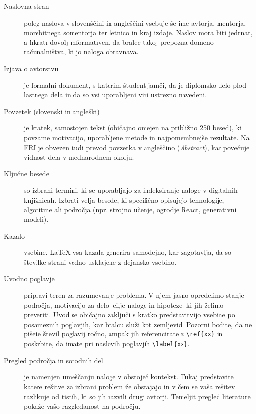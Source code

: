 \documentclass[a4paper,12pt,openright]{book}
\begin{document}
\begin{description}
    \item[Naslovna stran] poleg naslova v slovenščini in angleščini vsebuje še ime avtorja, mentorja, morebitnega somentorja ter letnico in kraj izdaje. Naslov mora biti jedrnat, a hkrati dovolj informativen, da bralec takoj prepozna domeno računalništva, ki jo naloga obravnava.
    
    \item[Izjava o avtorstvu] je formalni dokument, s katerim študent jamči, da je diplomsko delo plod lastnega dela in da so vsi uporabljeni viri ustrezno navedeni.
    
    \item[Povzetek (slovenski in angleški)] je kratek, samostojen tekst (običajno omejen na približno 250 besed), ki povzame motivacijo, uporabljene metode in najpomembnejše rezultate. Na FRI je obvezen tudi prevod povzetka v angleščino (\textit{Abstract}), kar povečuje vidnost dela v mednarodnem okolju.
    
    \item[Ključne besede] so izbrani termini, ki se uporabljajo za indeksiranje naloge v digitalnih knjižnicah. Izbrati velja besede, ki specifično opisujejo tehnologije, algoritme ali področja (npr. strojno učenje, ogrodje React, generativni modeli).
    
    \item[Kazalo] vsebine. \LaTeX{} vsa kazala generira samodejno, kar zagotavlja, da so številke strani vedno usklajene z dejansko vsebino.
    
    \item[Uvodno poglavje] pripravi teren za razumevanje problema. V njem jasno opredelimo stanje področja, motivacijo za delo, cilje naloge in hipoteze, ki jih želimo preveriti. Uvod se običajno zaključi s kratko predstavitvijo vsebine po posameznih poglavjih, kar bralcu služi kot zemljevid. Pozorni bodite, da ne pišete števil poglavij ročno, ampak jih referencirate z \verb=\ref{xx}= in poskrbite, da imate pri naslovih poglavjih \verb=\label{xx}=.
    
    \item[Pregled področja in sorodnih del] je namenjen umeščanju naloge v obstoječ kontekst. Tukaj predstavite katere rešitve za izbrani problem že obstajajo in v čem se vaša rešitev razlikuje od tistih, ki so jih razvili drugi avtorji. Temeljit pregled literature pokaže vašo razgledanost na področju.
    

\end{description}
\end{document}
